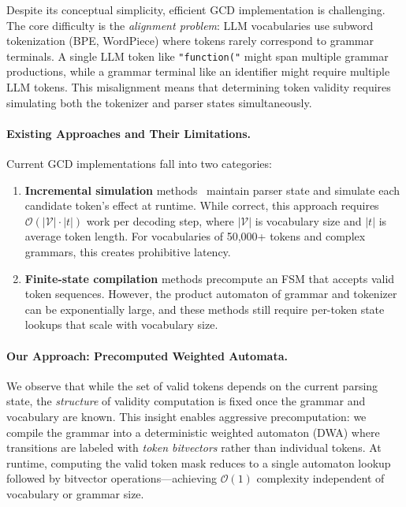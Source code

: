 \documentclass[11pt,a4paper]{article}
\newcommand{\bigO}{\mathcal{O}}
\newcommand{\vocab}{\mathcal{V}}
\theoremstyle{plain}
\theoremstyle{definition}
\theoremstyle{remark}
\begin{document}
Despite its conceptual simplicity, efficient GCD implementation is challenging. The core difficulty is the \emph{alignment problem}: LLM vocabularies use subword tokenization (BPE, WordPiece) where tokens rarely correspond to grammar terminals. A single LLM token like \texttt{"function("} might span multiple grammar productions, while a grammar terminal like an identifier might require multiple LLM tokens. This misalignment means that determining token validity requires simulating both the tokenizer and parser states simultaneously.

\paragraph{Existing Approaches and Their Limitations.}
Current GCD implementations fall into two categories:

\begin{enumerate}[leftmargin=*]
\item \textbf{Incremental simulation} methods~\citep{willard2023outlines,geng2023gcd} maintain parser state and simulate each candidate token's effect at runtime. While correct, this approach requires $\bigO(|\vocab| \cdot |t|)$ work per decoding step, where $|\vocab|$ is vocabulary size and $|t|$ is average token length. For vocabularies of 50,000+ tokens and complex grammars, this creates prohibitive latency.

\item \textbf{Finite-state compilation} methods precompute an FSM that accepts valid token sequences. However, the product automaton of grammar and tokenizer can be exponentially large, and these methods still require per-token state lookups that scale with vocabulary size.
\end{enumerate}

\paragraph{Our Approach: Precomputed Weighted Automata.}
We observe that while the set of valid tokens depends on the current parsing state, the \emph{structure} of validity computation is fixed once the grammar and vocabulary are known. This insight enables aggressive precomputation: we compile the grammar into a deterministic weighted automaton (DWA) where transitions are labeled with \emph{token bitvectors} rather than individual tokens. At runtime, computing the valid token mask reduces to a single automaton lookup followed by bitvector operations---achieving $\bigO(1)$ complexity independent of vocabulary or grammar size.
\end{document}
